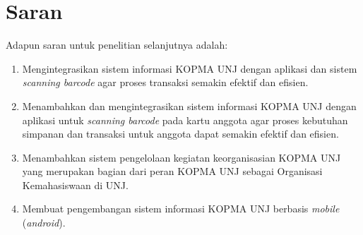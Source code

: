 \section{Saran}
Adapun saran untuk penelitian selanjutnya adalah:
\begin{enumerate} 
	\item Mengintegrasikan sistem informasi KOPMA UNJ dengan aplikasi dan sistem \textit{scanning barcode} agar proses transaksi semakin efektif dan efisien.
	\item Menambahkan dan mengintegrasikan sistem informasi KOPMA UNJ dengan aplikasi untuk \textit{scanning barcode} pada kartu anggota agar proses kebutuhan simpanan dan transaksi untuk anggota dapat semakin efektif dan efisien.
	\item Menambahkan sistem pengelolaan kegiatan keorganisasian KOPMA UNJ yang merupakan bagian dari peran KOPMA UNJ sebagai Organisasi Kemahasiswaan di UNJ.
	\item Membuat pengembangan sistem informasi KOPMA UNJ berbasis \textit{mobile} (\textit{android}).
\end{enumerate}


\begin{comment}

\end{comment}